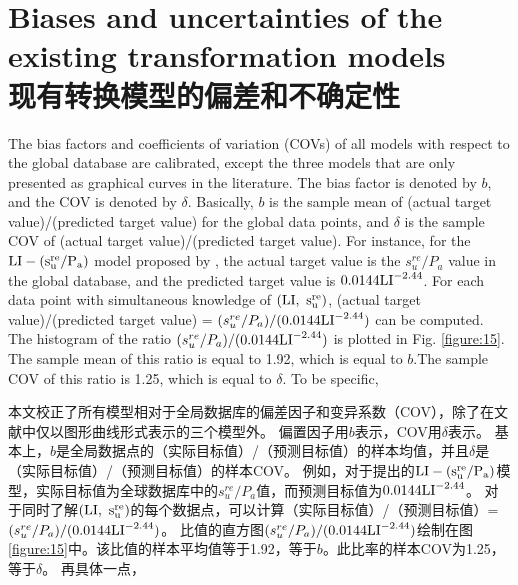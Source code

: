 \section{Biases and uncertainties of the existing transformation models \\现有转换模型的偏差和不确定性}

\begin{Parallel}{0.60\textwidth}{}
    \ParallelLText
    {
        The bias factors and coefficients of variation (COVs) of all models with respect to the global database are calibrated, except the three models that are only presented as graphical curves in the literature. The bias factor is denoted by $b$, and the COV is denoted by $\delta$. Basically, $b$ is the sample mean of (actual target value)/(predicted target value) for the global data points, and $\delta$ is the sample COV of (actual target value)/(predicted target value). For instance, for the $\rm{LI}-(s_u^{re}/P_a)$ model proposed by \citet{Locat1988799}, the actual target value is the $s_u^{re}/P_a$ value in the global database, and the predicted target value is $0.0144\rm{LI}^{-2.44}$. For each data point with simultaneous knowledge of $(\rm{LI},~s_u^{re})$, (actual target value)/(predicted target value) = $(s_u^{re}/P_a)/(0.0144\rm{LI}^{-2.44})$ can be computed. The histogram of the ratio $(s_u^{re}/P_a)/(0.0144\rm{LI}^{-2.44})$ is plotted in Fig. \ref{figure:15}. The sample mean of this ratio is equal to 1.92, which is equal to $b$.The sample COV of this ratio is 1.25, which is  equal to $\delta$. To be specific,
    }
    \ParallelRText
    {
        本文校正了所有模型相对于全局数据库的偏差因子和变异系数（COV），除了在文献中仅以图形曲线形式表示的三个模型外。 偏置因子用$b$表示，COV用$\delta$表示。 基本上，$b$是全局数据点的（实际目标值）/（预测目标值）的样本均值，并且$\delta$是（实际目标值）/（预测目标值）的样本COV。 例如，对于\citet{Locat1988799}提出的$\rm{LI}-(s_u^{re}/P_a)$模型，实际目标值为全球数据库中的$s_u^{re}/P_a$值，而预测目标值为$0.0144\rm{LI}^{-2.44}$。 对于同时了解$(\rm{LI},~s_u^{re})$的每个数据点，可以计算（实际目标值）/（预测目标值）= $(s_u^{re}/P_a)/(0.0144\rm{LI}^{-2.44})$。 比值的直方图$(s_u^{re}/P_a)/(0.0144\rm{LI}^{-2.44})$绘制在图\ref{figure:15}中。该比值的样本平均值等于1.92，等于$b$。此比率的样本COV为1.25，等于$\delta$。 再具体一点，
        
}
\end{Parallel}
